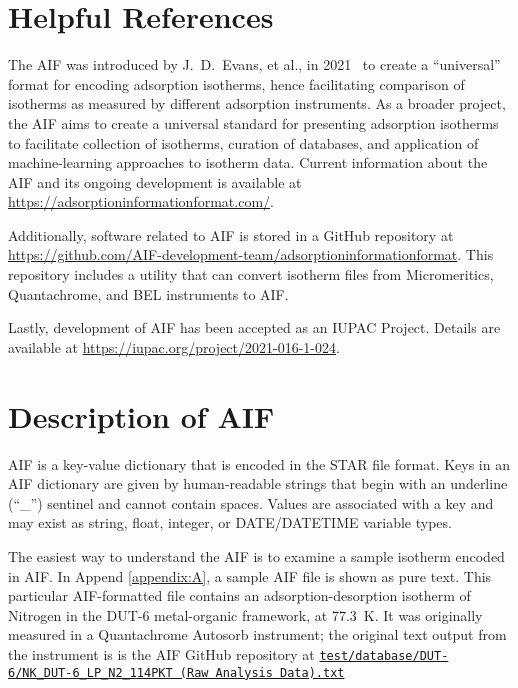 \documentclass[preprint,pre,showkeys,12pt,superscriptaddress,nofootinbib,endfloats*]{revtex4-1}
\begin{document}
\section{Helpful References}

The AIF was introduced by J.~D.~Evans, et al., in 2021~\cite{doi:10.1021/acs.langmuir.1c00122} to create a ``universal'' format for encoding adsorption isotherms, hence facilitating comparison of isotherms as measured by different adsorption instruments. As a broader project, the AIF aims to create a universal standard for presenting adsorption isotherms to facilitate collection of isotherms, curation of databases, and application of machine-learning approaches to isotherm data. Current information about the AIF and its ongoing development is available at \url{https://adsorptioninformationformat.com/}.

Additionally, software related to AIF is stored in a GitHub repository at \url{https://github.com/AIF-development-team/adsorptioninformationformat}. This repository includes a utility that can convert isotherm files from Micromeritics, Quantachrome, and BEL instruments to AIF.

Lastly, development of AIF has been accepted as an IUPAC Project. Details are available at \url{https://iupac.org/project/2021-016-1-024}.


\section{Description of AIF}

AIF is a key-value dictionary that is encoded in the STAR file format\cite{doi:10.1021/ci00002a020}. Keys in an AIF dictionary are given by human-readable strings that begin with an underline (``\_'') sentinel and cannot contain spaces. Values are associated with a key and may exist as string, float, integer, or DATE/DATETIME variable types.

The easiest way to understand the AIF is to examine a sample isotherm encoded in AIF. In Append \ref{appendix:A}, a sample AIF file is shown as pure text. This particular AIF-formatted file contains an adsorption-desorption isotherm of Nitrogen in the DUT-6 metal-organic framework, at 77.3~K. It was originally measured in a Quantachrome Autosorb instrument; the original text output from the instrument is is the AIF GitHub repository at \href{https://raw.githubusercontent.com/AIF-development-team/adsorptioninformationformat/master/test/database/DUT-6/NK_DUT-6_LP_N2_114PKT\%20(Raw\%20Analysis\%20Data).txt}{\texttt{test/database/DUT-6/NK\_DUT-6\_LP\_N2\_114PKT (Raw Analysis Data).txt}}
\end{document}
